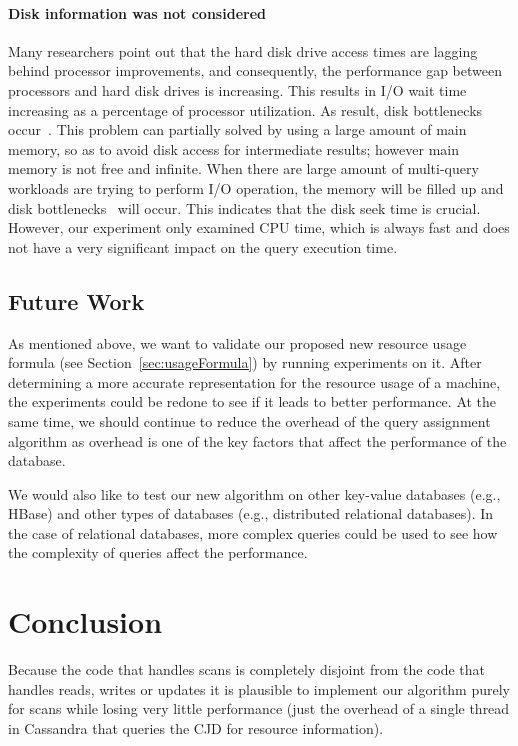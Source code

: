 \paragraph{Disk information was not considered}
Many researchers point out that the hard disk drive access times are lagging behind processor improvements, and consequently, the performance gap between processors and hard disk drives is increasing. This results in I/O wait time increasing as a percentage of processor utilization. As result, disk bottlenecks occur~\cite{IBM-IO, TMS-SSD}. This problem can partially solved by using a large amount of main memory, so as to avoid disk access for intermediate results; however main memory is not free and infinite. When there are large amount of multi-query workloads are trying to perform I/O operation, the memory will be filled up and disk bottlenecks~\cite{Bouganim:1998:MSL:288627.288646} will occur. This indicates that the disk seek time is crucial. However, our experiment only examined CPU time, which is always fast and does not have a very significant impact on the query execution time.

\subsection{Future Work}
As mentioned above, we want to validate our proposed new resource usage formula (see Section~\ref{sec:usageFormula}) by running experiments on it. After determining a more accurate representation for the resource usage of a machine, the experiments could be redone to see if it leads to better performance. At the same time, we should continue to reduce the overhead of the query assignment algorithm as overhead is one of the key factors that affect the performance of the database.

We would also like to test our new algorithm on other key-value databases (e.g., HBase) and other types of databases (e.g., distributed relational databases). In the case of relational databases, more complex queries could be used to see how the complexity of queries affect the performance.

\section{Conclusion}
\label{sec:conclusion}

Because the code that handles scans is completely disjoint from the code that handles reads, writes or updates it is plausible to implement our algorithm purely for scans while losing very little performance (just the overhead of a single thread in Cassandra that queries the CJD for resource information).
